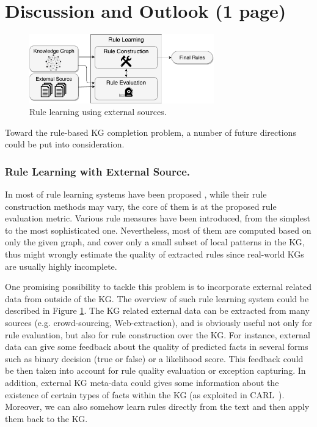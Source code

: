 \section{Discussion and Outlook (1 page)}
\label{sec:discussion_outlook}
\begin{figure}[t]
\centering
\includegraphics[width=8cm]{figures/discussion_overview}
\caption{Rule learning using external sources.}
\label{fig:discussion_overview}
\end{figure}
Toward the rule-based KG completion problem, a number of future directions could be put into consideration.
\subsubsection{Rule Learning with External Source.}
In most of rule learning systems have been proposed \cite{amie,op,rdf2rules}, while their rule construction methods may vary, the core of them is at the proposed rule evaluation metric. Various rule measures have been introduced, from the simplest to the most sophisticated one. Nevertheless, most of them are computed based on only the given graph, and cover only a small subset of local patterns in the KG, thus might wrongly estimate the quality of extracted rules since real-world KGs are usually highly incomplete.

One promising possibility to tackle this problem is to incorporate external related data from outside of the KG. The overview of such rule learning system could be described in Figure \ref{fig:discussion_overview}. The KG related external data can be extracted from many sources (e.g. crowd-sourcing, Web-extraction), and is obviously useful not only for rule evaluation, but also for rule construction over the KG. For instance, external data can give some feedback about the quality of predicted facts in several forms such as binary decision (\ie true or false) or a likelihood score. This feedback could be then taken into account for rule quality evaluation or exception capturing. In addition, external KG meta-data could gives some information about the existence of certain types of facts within the KG (as exploited in CARL~\cite{carl}). Moreover, we can also somehow learn rules directly from the text and then apply them back to the KG.

